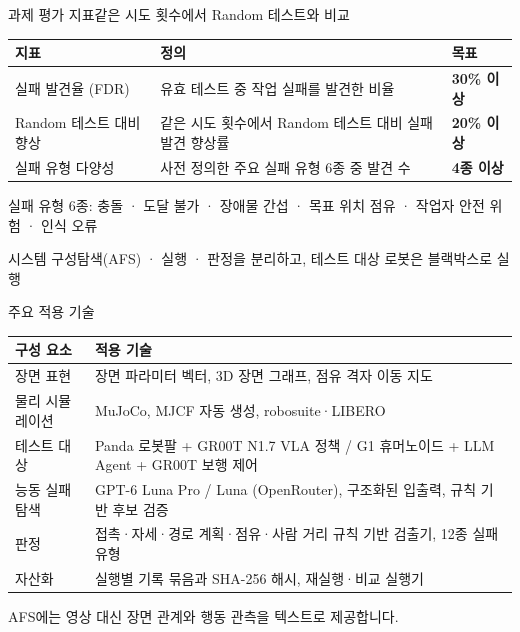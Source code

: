 \documentclass[aspectratio=169,11pt]{beamer}
\begin{document}
\begin{frame}{과제 평가 지표}{같은 시도 횟수에서 Random 테스트와 비교}
\vspace{6mm}
\begin{tabularx}{\textwidth}{@{}p{40mm}Yp{24mm}@{}}
\toprule
지표 & 정의 & 목표 \\
\midrule
실패 발견율 (FDR) & 유효 테스트 중 작업 실패를 발견한 비율 & \textbf{30\% 이상} \\
Random 테스트 대비 향상 & 같은 시도 횟수에서 Random 테스트 대비 실패 발견 향상률 & \textbf{20\% 이상} \\
실패 유형 다양성 & 사전 정의한 주요 실패 유형 6종 중 발견 수 & \textbf{4종 이상} \\
\bottomrule
\end{tabularx}
\vspace{8mm}

{\color{muted} 실패 유형 6종: 충돌 · 도달 불가 · 장애물 간섭 · 목표 위치 점유 · 작업자 안전 위험 · 인식 오류}
\end{frame}

\begin{frame}{시스템 구성}{탐색(AFS) · 실행 · 판정을 분리하고, 테스트 대상 로봇은 블랙박스로 실행}
\centering
\resizebox{!}{0.84\textheight}{}
\end{frame}

\begin{frame}{주요 적용 기술}
\vspace{4mm}
\small
\begin{tabularx}{\textwidth}{@{}p{34mm}Y@{}}
\toprule
구성 요소 & 적용 기술 \\
\midrule
장면 표현 & 장면 파라미터 벡터, 3D 장면 그래프, 점유 격자 이동 지도 \\
물리 시뮬레이션 & MuJoCo, MJCF 자동 생성, robosuite·LIBERO \\
테스트 대상 & Panda 로봇팔 + GR00T N1.7 VLA 정책 \quad / \quad G1 휴머노이드 + LLM Agent + GR00T 보행 제어 \\
능동 실패 탐색 & GPT-6 Luna Pro / Luna (OpenRouter), 구조화된 입출력, 규칙 기반 후보 검증 \\
판정 & 접촉·자세·경로 계획·점유·사람 거리 규칙 기반 검출기, 12종 실패 유형 \\
자산화 & 실행별 기록 묶음과 SHA-256 해시, 재실행·비교 실행기 \\
\bottomrule
\end{tabularx}
\vspace{5mm}

{\color{muted} AFS에는 영상 대신 장면 관계와 행동 관측을 텍스트로 제공합니다.}
\end{frame}
\end{document}
